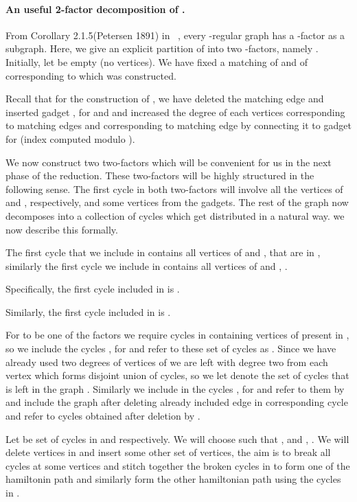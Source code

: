 \documentclass[svgnames]{llncs}
\begin{document}
{\paragraph{An useful 2-factor decomposition of .}
\label{2-factor} From Corollary 2.1.5(Petersen 1891) in ~\cite{DBLP:books/daglib/0030488}, every -regular graph has a -factor as a subgraph. Here, we give an explicit partition of  into two -factors, namely .  Initially, let  be empty (no vertices). We have fixed a matching
 of  and  of  corresponding to which  was constructed.

Recall that for the construction of , we have deleted the matching edge  and inserted gadget , for  and  and increased the degree of each vertices
 corresponding to matching edges  and 
corresponding to matching edge  by connecting it to gadget  for  (index computed modulo ). 

We now construct two two-factors which will be convenient for us in the next phase of the reduction. These two-factors will be highly structured in the following sense. The first cycle in both two-factors will involve all the vertices of  and , respectively, and some vertices from the gadgets. The rest of the graph now decomposes into a collection of cycles which get distributed in a natural way. we now describe this formally. 

The first cycle  that we include in  contains all vertices of  and ,  that are in ,
similarly the first cycle  we include in  contains all vertices of  and , .

Specifically, the first cycle included in  is .

Similarly, the first cycle  included in  is .


For  to be one of the factors we require cycles in  containing vertices of  present in , so we include the cycles , for  and
refer to these set of cycles as . Since we have already used two degrees of vertices of  we are left with degree two from each vertex which forms disjoint union of cycles, so we let  denote the set of cycles that is left in the graph . Similarly we include in  the cycles , for  and refer to them by 
and include the graph  after deleting already included edge in corresponding cycle and refer to cycles obtained after deletion by .



Let  be set of cycles in  and  respectively.
We will choose  such that ,  and ,
.
We will delete vertices in  and insert some other set of vertices, the aim is to break all cycles at some vertices 
and stitch together the broken cycles in  to form one of the hamiltonin path and similarly form the other hamiltonian path using
the cycles in .

}
\end{document}
